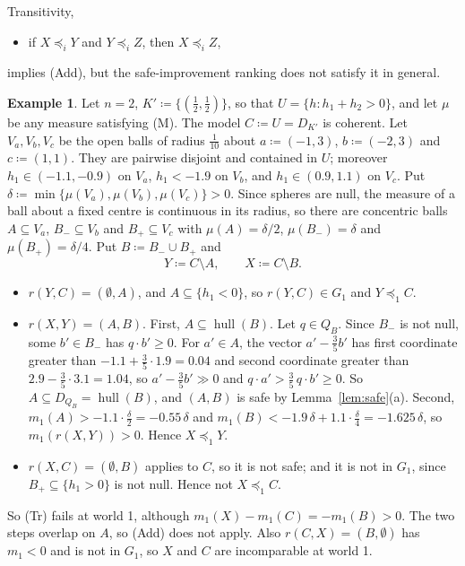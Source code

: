 \documentclass[11pt]{article}
\newcommand{\hull}{\operatorname{hull}}
\theoremstyle{plain}
\theoremstyle{definition}
\newtheorem{example}[theorem]{Example}
\theoremstyle{remark}
\begin{document}
Transitivity,
\begin{itemize}
  \item[(Tr)] if $X\preceq_iY$ and $Y\preceq_iZ$, then $X\preceq_iZ$,
\end{itemize}
implies (Add), but the safe-improvement ranking does not satisfy it in general.

\begin{example}\label{ex:tr}
Let $n=2$, $K'\coloneqq\{(\tfrac12,\tfrac12)\}$, so that $U=\{h:h_1+h_2>0\}$, and let
$\mu$ be any measure satisfying (M). The model $C\coloneqq U=D_{K'}$ is coherent. Let
$V_a,V_b,V_c$ be the open balls of radius $\tfrac1{10}$ about $a\coloneqq(-1,3)$,
$b\coloneqq(-2,3)$ and $c\coloneqq(1,1)$. They are pairwise disjoint and contained in $U$;
moreover $h_1\in(-1.1,-0.9)$ on $V_a$, $h_1<-1.9$ on $V_b$, and $h_1\in(0.9,1.1)$ on $V_c$.
Put $\delta\coloneqq\min\{\mu(V_a),\mu(V_b),\mu(V_c)\}>0$. Since spheres are null, the
measure of a ball about a fixed centre is continuous in its radius, so there are
concentric balls $A\subseteq V_a$, $B_-\subseteq V_b$ and $B_+\subseteq V_c$ with
$\mu(A)=\delta/2$, $\mu(B_-)=\delta$ and $\mu(B_+)=\delta/4$. Put $B\coloneqq B_-\cup B_+$
and
\[
  Y\coloneqq C\setminus A,\qquad X\coloneqq C\setminus B .
\]
\begin{itemize}
  \item $r(Y,C)=(\emptyset,A)$, and $A\subseteq\{h_1<0\}$, so $r(Y,C)\in G_1$ and
  $Y\preceq_1C$.
  \item $r(X,Y)=(A,B)$. First, $A\subseteq\hull(B)$. Let $q\in Q_B$. Since $B_-$ is not
  null, some $b'\in B_-$ has $q\cdot b'\ge0$. For $a'\in A$, the vector $a'-\tfrac35b'$
  has first coordinate greater than $-1.1+\tfrac35\cdot1.9=0.04$ and second coordinate
  greater than $2.9-\tfrac35\cdot3.1=1.04$, so $a'-\tfrac35b'\gg0$ and $q\cdot a'>
  \tfrac35\,q\cdot b'\ge0$. So $A\subseteq D_{Q_B}=\hull(B)$, and $(A,B)$ is safe by
  Lemma~\ref{lem:safe}(a). Second, $m_1(A)>-1.1\cdot\tfrac\delta2=-0.55\,\delta$ and
  $m_1(B)<-1.9\,\delta+1.1\cdot\tfrac\delta4=-1.625\,\delta$, so $m_1(r(X,Y))>0$. Hence
  $X\preceq_1Y$.
  \item $r(X,C)=(\emptyset,B)$ applies to $C$, so it is not safe; and it is not in $G_1$,
  since $B_+\subseteq\{h_1>0\}$ is not null. Hence not $X\preceq_1C$.
\end{itemize}
So (Tr) fails at world 1, although $m_1(X)-m_1(C)=-m_1(B)>0$. The two steps overlap on
$A$, so (Add) does not apply. Also $r(C,X)=(B,\emptyset)$ has $m_1<0$ and is not in $G_1$,
so $X$ and $C$ are incomparable at world 1.
\end{example}
\end{document}
